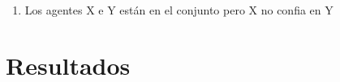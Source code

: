 \documentclass{article}
\begin{document}
\begin{enumerate}
	\item Los agentes X e Y están en el conjunto pero X no confia en Y
\end{enumerate}



\section{Resultados}
\end{document}
